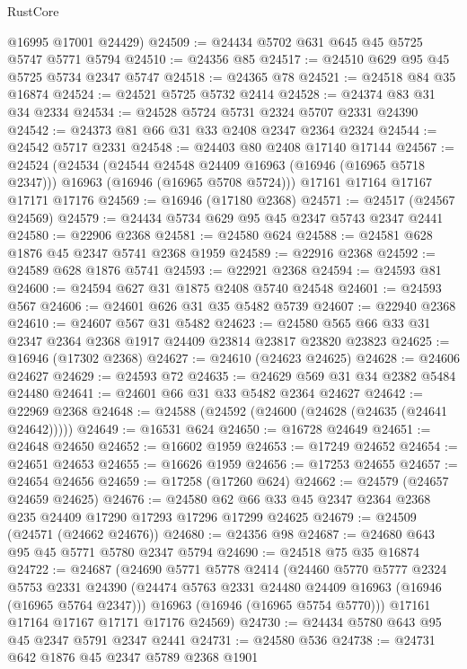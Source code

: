 \begin{lexlean}{RustCore}
\begin{coremodule}
      @16995
      @17001
      @24429)
@24509 := @24434 @5702 @631 @645 @45 @5725 @5747 @5771 @5794
@24510 := @24356 @85
@24517 := @24510 @629 @95 @45 @5725 @5734 @2347 @5747
@24518 := @24365 @78
@24521 := @24518 @84 @35 @16874
@24524 := @24521 @5725 @5732 @2414
@24528 := @24374 @83 @31 @34 @2334
@24534 := @24528 @5724 @5731 @2324 @5707 @2331 @24390
@24542 := @24373 @81 @66 @31 @33 @2408 @2347 @2364 @2324
@24544 := @24542 @5717 @2331
@24548 := @24403 @80 @2408 @17140 @17144
@24567 := @24524
    (@24534
      (@24544 @24548 @24409 @16963 (@16946 (@16965 @5718 @2347)))
      @16963
      (@16946 (@16965 @5708 @5724)))
    @17161
    @17164
    @17167
    @17171
    @17176
@24569 := @16946 (@17180 @2368)
@24571 := @24517 (@24567 @24569)
@24579 := @24434 @5734 @629 @95 @45 @2347 @5743 @2347 @2441
@24580 := @22906 @2368
@24581 := @24580 @624
@24588 := @24581 @628 @1876 @45 @2347 @5741 @2368 @1959
@24589 := @22916 @2368
@24592 := @24589 @628 @1876 @5741
@24593 := @22921 @2368
@24594 := @24593 @81
@24600 := @24594 @627 @31 @1875 @2408 @5740 @24548
@24601 := @24593 @567
@24606 := @24601 @626 @31 @35 @5482 @5739
@24607 := @22940 @2368
@24610 := @24607 @567 @31 @5482
@24623 := @24580 @565 @66 @33 @31 @2347 @2364 @2368 @1917 @24409 @23814 @23817 @23820 @23823
@24625 := @16946 (@17302 @2368)
@24627 := @24610 (@24623 @24625)
@24628 := @24606 @24627
@24629 := @24593 @72
@24635 := @24629 @569 @31 @34 @2382 @5484 @24480
@24641 := @24601 @66 @31 @33 @5482 @2364 @24627
@24642 := @22969 @2368
@24648 := @24588 (@24592 (@24600 (@24628 (@24635 (@24641 @24642)))))
@24649 := @16531 @624
@24650 := @16728 @24649
@24651 := @24648 @24650
@24652 := @16602 @1959
@24653 := @17249 @24652
@24654 := @24651 @24653
@24655 := @16626 @1959
@24656 := @17253 @24655
@24657 := @24654 @24656
@24659 := @17258 (@17260 @624)
@24662 := @24579 (@24657 @24659 @24625)
@24676 := @24580 @62 @66 @33 @45 @2347 @2364 @2368 @235 @24409 @17290 @17293 @17296 @17299 @24625
@24679 := @24509 (@24571 (@24662 @24676))
@24680 := @24356 @98
@24687 := @24680 @643 @95 @45 @5771 @5780 @2347 @5794
@24690 := @24518 @75 @35 @16874
@24722 := @24687
    (@24690
      @5771
      @5778
      @2414
      (@24460
        @5770
        @5777
        @2324
        @5753
        @2331
        @24390
        (@24474 @5763 @2331 @24480 @24409 @16963 (@16946 (@16965 @5764 @2347)))
        @16963
        (@16946 (@16965 @5754 @5770)))
      @17161
      @17164
      @17167
      @17171
      @17176
      @24569)
@24730 := @24434 @5780 @643 @95 @45 @2347 @5791 @2347 @2441
@24731 := @24580 @536
@24738 := @24731 @642 @1876 @45 @2347 @5789 @2368 @1901

\end{coremodule}
\end{lexlean}
